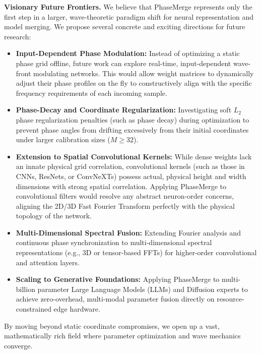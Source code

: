 \textbf{Visionary Future Frontiers.} We believe that PhaseMerge represents only the first step in a larger, wave-theoretic paradigm shift for neural representation and model merging. We propose several concrete and exciting directions for future research:
\begin{itemize}
    \item \textbf{Input-Dependent Phase Modulation:} Instead of optimizing a static phase grid offline, future work can explore real-time, input-dependent wave-front modulating networks. This would allow weight matrices to dynamically adjust their phase profiles on the fly to constructively align with the specific frequency requirements of each incoming sample.
    \item \textbf{Phase-Decay and Coordinate Regularization:} Investigating soft $L_2$ phase regularization penalties (such as phase decay) during optimization to prevent phase angles from drifting excessively from their initial coordinates under larger calibration sizes ($M \ge 32$).
    \item \textbf{Extension to Spatial Convolutional Kernels:} While dense weights lack an innate physical grid correlation, convolutional kernels (such as those in CNNs, ResNets, or ConvNeXTs) possess actual, physical height and width dimensions with strong spatial correlation. Applying PhaseMerge to convolutional filters would resolve any abstract neuron-order concerns, aligning the 2D/3D Fast Fourier Transform perfectly with the physical topology of the network.
    \item \textbf{Multi-Dimensional Spectral Fusion:} Extending Fourier analysis and continuous phase synchronization to multi-dimensional spectral representations (e.g., 3D or tensor-based FFTs) for higher-order convolutional and attention layers.
    \item \textbf{Scaling to Generative Foundations:} Applying PhaseMerge to multi-billion parameter Large Language Models (LLMs) and Diffusion experts to achieve zero-overhead, multi-modal parameter fusion directly on resource-constrained edge hardware.
\end{itemize}
By moving beyond static coordinate compromises, we open up a vast, mathematically rich field where parameter optimization and wave mechanics converge.
